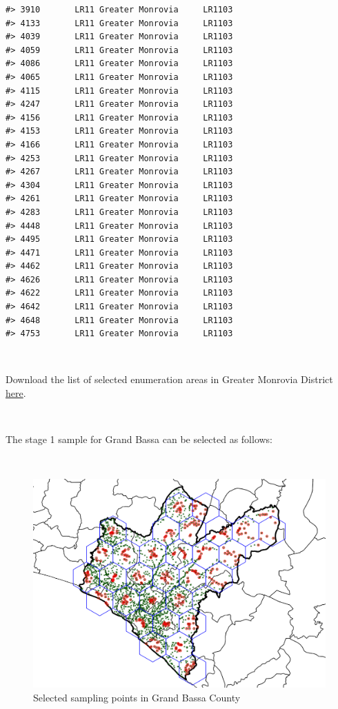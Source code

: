 \documentclass[12pt,a4paper]{book}
\theoremstyle{definition}
\theoremstyle{definition}
\theoremstyle{definition}
\theoremstyle{remark}
\let\BeginKnitrBlock\begin \let\EndKnitrBlock\end
\begin{document}
\begin{verbatim}
#> 3910       LR11 Greater Monrovia     LR1103
#> 4133       LR11 Greater Monrovia     LR1103
#> 4039       LR11 Greater Monrovia     LR1103
#> 4059       LR11 Greater Monrovia     LR1103
#> 4086       LR11 Greater Monrovia     LR1103
#> 4065       LR11 Greater Monrovia     LR1103
#> 4115       LR11 Greater Monrovia     LR1103
#> 4247       LR11 Greater Monrovia     LR1103
#> 4156       LR11 Greater Monrovia     LR1103
#> 4153       LR11 Greater Monrovia     LR1103
#> 4166       LR11 Greater Monrovia     LR1103
#> 4253       LR11 Greater Monrovia     LR1103
#> 4267       LR11 Greater Monrovia     LR1103
#> 4304       LR11 Greater Monrovia     LR1103
#> 4261       LR11 Greater Monrovia     LR1103
#> 4283       LR11 Greater Monrovia     LR1103
#> 4448       LR11 Greater Monrovia     LR1103
#> 4495       LR11 Greater Monrovia     LR1103
#> 4471       LR11 Greater Monrovia     LR1103
#> 4462       LR11 Greater Monrovia     LR1103
#> 4626       LR11 Greater Monrovia     LR1103
#> 4622       LR11 Greater Monrovia     LR1103
#> 4642       LR11 Greater Monrovia     LR1103
#> 4648       LR11 Greater Monrovia     LR1103
#> 4753       LR11 Greater Monrovia     LR1103
\end{verbatim}

~

\BeginKnitrBlock{rmddownload}
Download the list of selected enumeration areas in Greater Monrovia
District \href{data/greaterMonroviaSPlist.csv}{here}.
\EndKnitrBlock{rmddownload}

~

The stage 1 sample for Grand Bassa can be selected as follows:

~

\begin{figure}[H]

\includegraphics{figures/sample25-1} \hfill{}

\caption{Selected sampling points in Grand Bassa County}\label{fig:sample25}
\end{figure}
\end{document}
